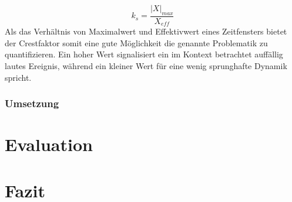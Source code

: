 \documentclass[paper=a4, fontsize=12pt]{scrartcl}
\numberwithin{equation}{section}		%
\numberwithin{figure}{section}			%
\numberwithin{table}{section}				%
\begin{document}
\begin{equation}
	k_s = \frac{|X|_{max}}{X_{eff}}
\end{equation}
Als das Verhältnis von Maximalwert und Effektivwert eines Zeitfensters bietet der Crestfaktor somit eine gute Möglichkeit die genannte Problematik zu quantifizieren. Ein hoher Wert signalisiert ein im Kontext betrachtet auffällig lautes Ereignis, während ein kleiner Wert für eine wenig sprunghafte Dynamik spricht.

\subsubsection{Umsetzung}

\section{Evaluation}

\section{Fazit}





\printbibliography
\end{document}

